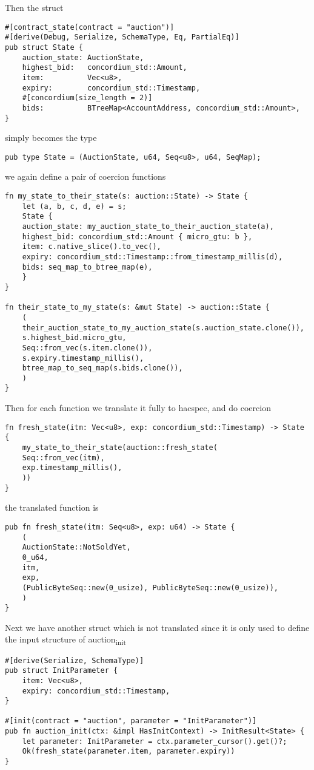 \documentclass[11pt]{article}
\begin{document}
Then the struct
\begin{verbatim}
#[contract_state(contract = "auction")]
#[derive(Debug, Serialize, SchemaType, Eq, PartialEq)]
pub struct State {
    auction_state: AuctionState,
    highest_bid:   concordium_std::Amount,
    item:          Vec<u8>,
    expiry:        concordium_std::Timestamp,
    #[concordium(size_length = 2)]
    bids:          BTreeMap<AccountAddress, concordium_std::Amount>,
}
\end{verbatim}
simply becomes the type
\begin{verbatim}
pub type State = (AuctionState, u64, Seq<u8>, u64, SeqMap);
\end{verbatim}
we again define a pair of coercion functions
\begin{verbatim}
fn my_state_to_their_state(s: auction::State) -> State {
    let (a, b, c, d, e) = s;
    State {
	auction_state: my_auction_state_to_their_auction_state(a),
	highest_bid: concordium_std::Amount { micro_gtu: b },
	item: c.native_slice().to_vec(),
	expiry: concordium_std::Timestamp::from_timestamp_millis(d),
	bids: seq_map_to_btree_map(e),
    }
}

fn their_state_to_my_state(s: &mut State) -> auction::State {
    (
	their_auction_state_to_my_auction_state(s.auction_state.clone()),
	s.highest_bid.micro_gtu,
	Seq::from_vec(s.item.clone()),
	s.expiry.timestamp_millis(),
	btree_map_to_seq_map(s.bids.clone()),
    )
}
\end{verbatim}
Then for each function we translate it fully to hacspec, and do coercion
\begin{verbatim}
fn fresh_state(itm: Vec<u8>, exp: concordium_std::Timestamp) -> State {
    my_state_to_their_state(auction::fresh_state(
	Seq::from_vec(itm),
	exp.timestamp_millis(),
    ))
}
\end{verbatim}
the translated function is
\begin{verbatim}
pub fn fresh_state(itm: Seq<u8>, exp: u64) -> State {
    (
	AuctionState::NotSoldYet,
	0_u64,
	itm,
	exp,
	(PublicByteSeq::new(0_usize), PublicByteSeq::new(0_usize)),
    )
}
\end{verbatim}
Next we have another struct which is not translated since it is only used to define the input structure of auction\textsubscript{init}
\begin{verbatim}
#[derive(Serialize, SchemaType)]
pub struct InitParameter {
    item: Vec<u8>,
    expiry: concordium_std::Timestamp,
}

#[init(contract = "auction", parameter = "InitParameter")]
pub fn auction_init(ctx: &impl HasInitContext) -> InitResult<State> {
    let parameter: InitParameter = ctx.parameter_cursor().get()?;
    Ok(fresh_state(parameter.item, parameter.expiry))
}
\end{verbatim}
\end{document}
